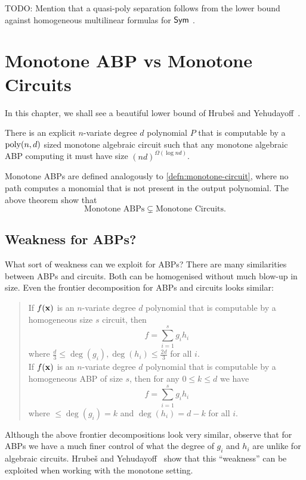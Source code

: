 TODO: Mention that a quasi-poly separation follows from the lower bound against homogeneous multilinear formulas for $\operatorname{\mathsf{Sym}}$ \cite{HY11a}.

\section{Monotone ABP vs Monotone Circuits}
In this chapter, we shall see a beautiful lower bound of Hrube\v{s} and Yehudayoff~\cite{HY16}.

\begin{theorem}\label{thm:mon-abp-ckt-sep}
  There is an explicit $n$-variate degree $d$ polynomial $P$ that is computable by a $\operatorname{poly}(n,d)$ sized monotone algebraic circuit such that any monotone algebraic ABP computing it must have size $(nd)^{\Omega(\log nd)}$.
\end{theorem}

Monotone ABPs are defined analogously to \autoref{defn:monotone-circuit}, where no path computes a monomial that is not present in the output polynomial. The above theorem show that
  \[
    \text{Monotone ABPs} \subsetneq \text{Monotone Circuits}.
  \]

\subsection*{Weakness for ABPs?}

What sort of weakness can we exploit for ABPs? There are many similarities between ABPs and circuits. Both can be homogenised without much blow-up in size. Even the frontier decomposition for ABPs and circuits looks similar:
\begin{quote}
  If $f(\mathbf{x})$ is an $n$-variate degree $d$ polynomial that is computable by a homogeneous size $s$ circuit, then
  \[
    f = \sum_{i=1}^s g_i h_i
  \]
  where $\frac{d}{3} \leq \deg(g_i),\deg(h_i) \leq \frac{2d}{3}$ for all $i$.\\

  If $f(\mathbf{x})$ is an $n$-variate degree $d$ polynomial that is computable by a homogeneous ABP of size $s$, then for any $0\leq k \leq d$ we have
  \[
    f = \sum_{i=1}^s g_i h_i
  \]
  where $\leq \deg(g_i) = k$ and $\deg(h_i) =  d-k$ for all $i$.
\end{quote}

Although the above frontier decompositions look very similar, observe that for ABPs we have a much finer control of what the degree of $g_i$ and $h_i$ are unlike for algebraic circuits. Hrube\v{s} and Yehudayoff~\cite{HY16} show that this ``weakness'' can be exploited when working with the monotone setting.

